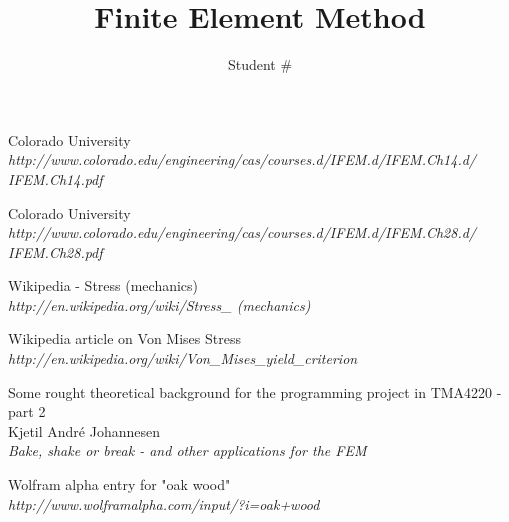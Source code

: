 \documentclass[9pt]{extarticle}
\title{Finite Element Method}
\author{Student \# }
\begin{document}
\maketitle































\begin{thebibliography}{3}

	Colorado University\\
	\emph{http://www.colorado.edu/engineering/cas/courses.d/IFEM.d/IFEM.Ch14.d/\\IFEM.Ch14.pdf}


	Colorado University\\
	\emph{http://www.colorado.edu/engineering/cas/courses.d/IFEM.d/IFEM.Ch28.d/\\IFEM.Ch28.pdf}	



Wikipedia - Stress (mechanics) \\
\emph{http://en.wikipedia.org/wiki/Stress\_ (mechanics)}

Wikipedia article on Von Mises Stress \\
\emph{http://en.wikipedia.org/wiki/Von\_Mises\_yield\_criterion}

Some rought theoretical background for the programming project in TMA4220 - part 2 \\
Kjetil André Johannesen \\
\emph{Bake, shake or break - and other applications for the FEM}

	Wolfram alpha entry for "oak wood"\\
	\emph{http://www.wolframalpha.com/input/?i=oak+wood}
	



\end{thebibliography}
\end{document}
